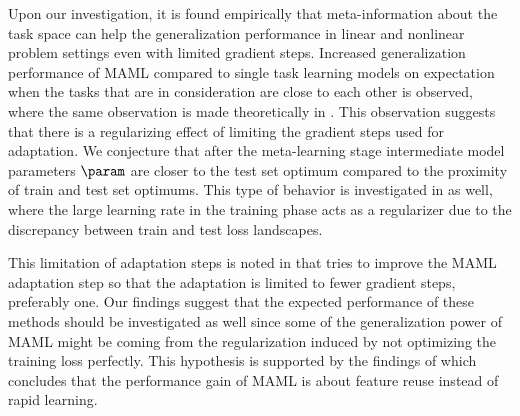 Upon our investigation, it is found empirically that meta-information about the task space can help the generalization performance in linear and nonlinear problem settings even with limited gradient steps. Increased generalization performance of MAML compared to single task learning models on expectation when the tasks that are in consideration are close to each other is observed, where the same observation is made theoretically in \cite{fallah2021}. This observation suggests that there is a regularizing effect of limiting the gradient steps used for adaptation. We conjecture that after the meta-learning stage intermediate model parameters $\param$ are closer to the test set optimum compared to the proximity of train and test set optimums. This type of behavior is investigated in \cite{nakkiran2020} as well, where the large learning rate in the training phase acts as a regularizer due to the discrepancy between train and test loss landscapes. 

This limitation of adaptation steps is noted in \cite{behl2019,li2017b} that tries to improve the MAML adaptation step so that the adaptation is limited to fewer gradient steps, preferably one. Our findings suggest that the expected performance of these methods should be investigated as well since some of the generalization power of MAML might be coming from the regularization induced by not optimizing the training loss perfectly. This hypothesis is supported by the findings of \cite{raghu2020} which concludes that the performance gain of MAML is about feature reuse instead of rapid learning.

